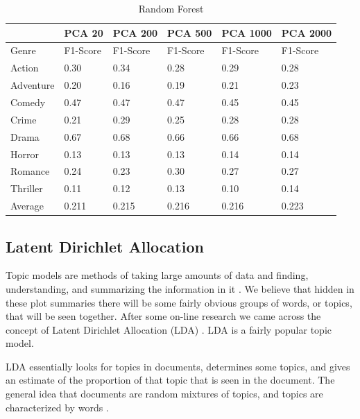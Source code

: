 \documentclass[11pt]{article}
\begin{document}
\begin{table}[h]
	\label{tab:randf_scores}
\begin{center}
	\begin{tabular}{| l | l | l | l | l | l |}
		\hline		         
                  & PCA 20    & PCA 200           & PCA 500     & PCA 1000  & PCA 2000 \\\hline
        Genre     & F1-Score  & F1-Score          & F1-Score    & F1-Score  & F1-Score\\\hline		
	  	Action    & 0.30     & 0.34		          & 0.28        & 0.29      & 0.28\\
		Adventure & 0.20     & 0.16		          & 0.19        & 0.21      & 0.23\\
		Comedy    & 0.47     & 0.47		          & 0.47        & 0.45      & 0.45\\
		Crime     & 0.21     & 0.29		          & 0.25        & 0.28      & 0.28\\
		Drama     & 0.67     & 0.68		          & 0.66        & 0.66      & 0.68\\
		Horror    & 0.13     & 0.13		          & 0.13        & 0.14      & 0.14\\
		Romance   & 0.24     & 0.23		          & 0.30        & 0.27      & 0.27\\ 
		Thriller  & 0.11     & 0.12		          & 0.13        & 0.10      & 0.14\\\hline
		Average   & 0.211     & 0.215 	          & 0.216       & 0.216     & 0.223 \\\hline       
	\end{tabular} 
\end{center}
	\caption{Random Forest}
\end{table}


\subsection{Latent Dirichlet Allocation}
\label{sec:lda}

Topic models are methods of taking large amounts of data and finding, understanding, and summarizing the information in it \cite{wiki:topic_model, kdnuggets:topic_model}. We believe that hidden in these plot summaries there will be some fairly obvious groups of words, or topics, that will be seen together. After some on-line research we came across the concept of Latent Dirichlet Allocation (LDA) \cite{blei2003}. LDA is a fairly popular topic model. 

LDA essentially looks for topics in documents, determines some topics, and gives an estimate of the proportion of that topic that is seen in the document. The general idea that documents are random mixtures of topics, and topics are characterized by words \cite{blei2003}. 
\end{document}
